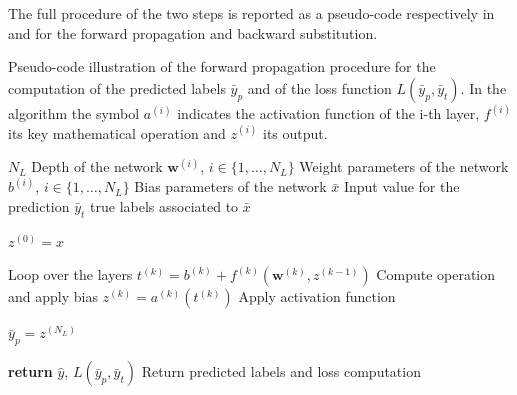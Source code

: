 The full procedure of the two steps is reported as a pseudo-code respectively in  and  for the forward propagation and backward substitution. 

\begin{algorithm}[H]
\caption{Pseudo-code illustration of the forward propagation procedure for the computation of the predicted labels $\bar{y}_p$ and of the loss function $L(\bar{y}_p,\bar{y}_t)$. In the algorithm the symbol $a^{(i)}$ indicates the activation function of the i-th layer, $f^{(i)}$ its key mathematical operation and $z^{(i)}$ its output.}
\label{alg:fow_prop}
\begin{algorithmic}[1]
\Require $N_L$ \Comment Depth of the network
\Require $\mathbf{w}^{(i)}$, $i \in \{1,\dots,N_L\}$ \Comment Weight parameters of the network
\Require $b^{(i)}$, $i \in \{1,\dots,N_L\}$ \Comment Bias parameters of the network
\Require $\bar{x}$ \Comment Input value for the prediction
\Require $\bar{y}_t$ \Comment true labels associated to $\bar{x}$


\State $z^{(0)} = x$

 \Comment Loop over the layers
\State $t^{(k)} = b^{(k)} + f^{(k)}\left(\mathbf{w}^{(k)}, z^{(k-1)}\right)$ \Comment Compute operation and apply bias
\State $z^{(k)} = a^{(k)}(t^{(k)})$ \Comment Apply activation function
\EndFor

\State $\bar{y}_p = z^{(N_L)}$

\State \textbf{return} $\hat{y}$, $L(\bar{y}_p,\bar{y}_t)$ \Comment Return predicted labels and loss computation 
\EndProcedure
\end{algorithmic}
\end{algorithm}


